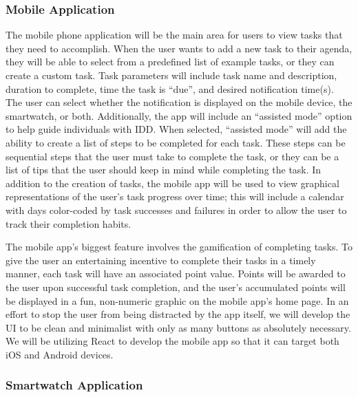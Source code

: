 \documentclass[12pt,letterpaper]{article}
\begin{document}
\subsubsection*{Mobile Application}

The mobile phone application will be the main area for users to view tasks that they need to accomplish. When the user wants to add a new task to their agenda, they will be able to select from a predefined list of example tasks, or they can create a custom task. Task parameters will include task name and description, duration to complete, time the task is “due”, and desired notification time(s). The user can select whether the notification is displayed on the mobile device, the smartwatch, or both. Additionally, the app will include an “assisted mode” option to help guide individuals with IDD. When selected, “assisted mode” will add the ability to create a list of steps to be completed for each task. These steps can be sequential steps that the user must take to complete the task, or they can be a list of tips that the user should keep in mind while completing the task. In addition to the creation of tasks, the mobile app will be used to view graphical representations of the user’s task progress over time; this will include a calendar with days color-coded by task successes and failures in order to allow the user to track their completion habits.

The mobile app’s biggest feature involves the gamification of completing tasks. To give the user an entertaining incentive to complete their tasks in a timely manner, each task will have an associated point value. Points will be awarded to the user upon successful task completion, and the user’s accumulated points will be displayed in a fun, non-numeric graphic on the mobile app’s home page. In an effort to stop the user from being distracted by the app itself, we will develop the UI to be clean and minimalist with only as many buttons as absolutely necessary. We will be utilizing React to develop the mobile app so that it can target both iOS and Android devices.

\subsubsection*{Smartwatch Application}
\end{document}

